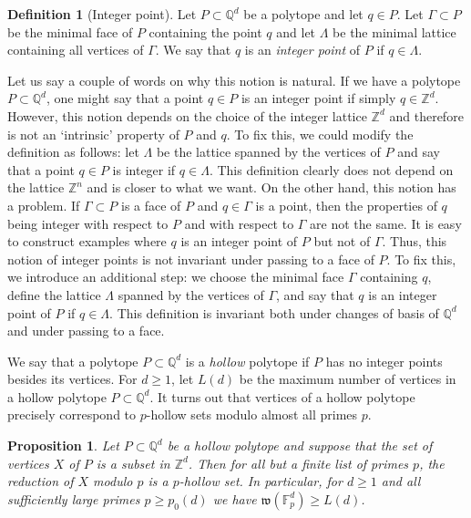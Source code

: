 \documentclass{daj}
\renewcommand{\ge}{\geqslant}
\newcommand{\w}{\mathfrak w}
\newcommand{\Q}{\mathbb Q}
\newcommand{\Z}{\mathbb Z}
\newcommand{\FF}{\mathbb F}
\newtheorem{prop}[theorem]{Proposition}
\theoremstyle{definition}
\newtheorem{defi}[theorem]{Definition}
\theoremstyle{remark}
\theoremstyle{definition}
\theoremstyle{definition}
\begin{document}
\begin{defi}[Integer point]\label{intpt}
Let $P \subset \Q^d$ be a polytope and let $q \in P$. Let $\Gamma \subset P$ be the minimal face of $P$ containing the point $q$ and let $\Lambda$ be the minimal lattice containing all vertices of $\Gamma$. We say that $q$ is an {\it integer point} of $P$ if $q \in \Lambda$.
\end{defi}

Let us say a couple of words on why this notion is natural. 
If we have a polytope $P \subset \Q^d$, one might say that a point $q \in P$ is an integer point if simply $q \in \Z^d$. However, this notion depends on the choice of the integer lattice $\Z^d$ and therefore is not an `intrinsic' property of $P$ and $q$. To fix this, we could modify the definition as follows: let $\Lambda$ be the lattice spanned by the vertices of $P$ and say that a point $q \in P$ is integer if $q \in \Lambda$. This definition clearly does not depend on the lattice $\Z^n$ and is closer to what we want.
On the other hand, this notion has a problem. If $\Gamma \subset P$ is a face of $P$ and $q \in \Gamma$ is a point, then the properties of $q$ being integer with respect to $P$ and with respect to $\Gamma$ are not the same. It is easy to construct examples where $q$ is an integer point of $P$ but not of $\Gamma$. Thus, this notion of integer points is not invariant under passing to a face of $P$. To fix this, we introduce an additional step: we choose the minimal face $\Gamma$ containing $q$, define the lattice $\Lambda$ spanned by the vertices of $\Gamma$, and say that $q$ is an integer point of $P$ if $q \in \Lambda$. This definition is invariant both under changes of basis of $\Q^d$ and under passing to a face.


We say that a polytope $P \subset \Q^d$ is a {\it hollow} polytope if $P$ has no integer points besides its vertices. For $d\ge 1$, let $L(d)$ be the maximum number of vertices in a hollow polytope $P \subset \Q^d$. It turns out that vertices of a hollow polytope precisely correspond to $p$-hollow sets modulo almost all primes $p$.

\begin{prop}\label{wl}
Let $P \subset \Q^d$ be a hollow polytope and suppose that the set of vertices $X$ of $P$ is a subset in $\Z^d$. Then for all but a finite list of primes $p$, the reduction of $X$ modulo $p$ is a $p$-hollow set.
In particular, for $d \ge 1$ and all sufficiently large primes $p \ge p_0(d)$ we have $\w(\FF_p^d) \ge L(d)$. 
\end{prop}
\end{document}
